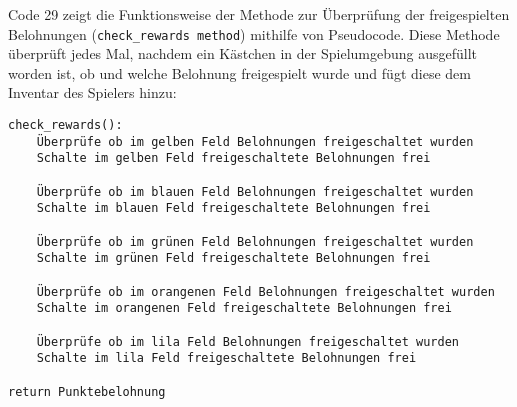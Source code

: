 \begin{minipage}{\linewidth}
Code 29 zeigt die Funktionsweise der Methode zur Überprüfung der freigespielten Belohnungen (\texttt{check\_rewards method}) mithilfe von Pseudocode. Diese Methode überprüft jedes Mal, nachdem ein Kästchen in der Spielumgebung ausgefüllt worden ist, ob und welche Belohnung freigespielt wurde und fügt diese dem Inventar des Spielers hinzu:
\vspace{0.5cm}
\begin{lstlisting}[caption={Methode zur Überprüfung der freigespielten Belohnungen}]
check_rewards():
	Überprüfe ob im gelben Feld Belohnungen freigeschaltet wurden
	Schalte im gelben Feld freigeschaltete Belohnungen frei
	
	Überprüfe ob im blauen Feld Belohnungen freigeschaltet wurden
	Schalte im blauen Feld freigeschaltete Belohnungen frei
	
	Überprüfe ob im grünen Feld Belohnungen freigeschaltet wurden
	Schalte im grünen Feld freigeschaltete Belohnungen frei
	
	Überprüfe ob im orangenen Feld Belohnungen freigeschaltet wurden
	Schalte im orangenen Feld freigeschaltete Belohnungen frei
	
	Überprüfe ob im lila Feld Belohnungen freigeschaltet wurden
	Schalte im lila Feld freigeschaltete Belohnungen frei

return Punktebelohnung
\end{lstlisting}
\end{minipage}

